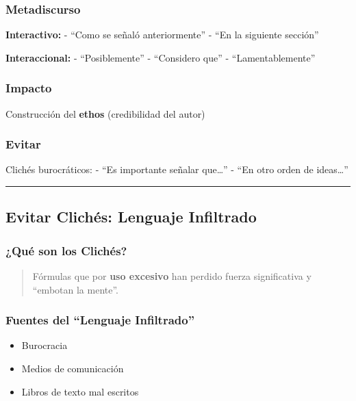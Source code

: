\documentclass[
  11pt,
]{beaner}
\providecommand{\tightlist}{%
  \setlength{\itemsep}{0pt}\setlength{\parskip}{0pt}}
\begin{document}
\subsubsection{Metadiscurso}\label{metadiscurso}

\textbf{Interactivo:} - ``Como se señaló anteriormente'' - ``En la
siguiente sección''

\textbf{Interaccional:} - ``Posiblemente'' - ``Considero que'' -
``Lamentablemente''

\subsubsection{Impacto}\label{impacto-1}

Construcción del \textbf{ethos} (credibilidad del autor)

\subsubsection{Evitar}\label{evitar-2}

Clichés burocráticos: - ``Es importante señalar que\ldots{}'' - ``En
otro orden de ideas\ldots{}''

\begin{center}\rule{0.5\linewidth}{0.5pt}\end{center}

\subsection{Evitar Clichés: Lenguaje
Infiltrado}\label{evitar-clichuxe9s-lenguaje-infiltrado}

\subsubsection{¿Qué son los Clichés?}\label{quuxe9-son-los-clichuxe9s}

\begin{quote}
Fórmulas que por \textbf{uso excesivo} han perdido fuerza significativa
y ``embotan la mente''.
\end{quote}

\subsubsection{Fuentes del ``Lenguaje
Infiltrado''}\label{fuentes-del-lenguaje-infiltrado}

\begin{itemize}
\tightlist
\item
  Burocracia
\item
  Medios de comunicación
\item
  Libros de texto mal escritos
\end{itemize}
\end{document}
